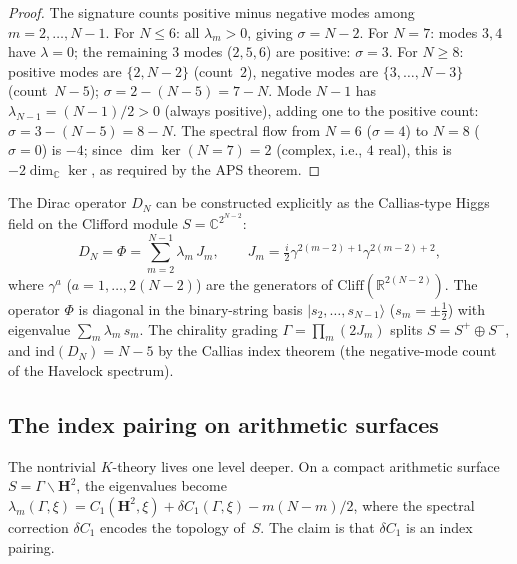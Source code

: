 \begin{proof}
The signature counts positive minus negative modes
among $m = 2, \ldots, N{-}1$.
For $N \le 6$: all $\lambda_m > 0$, giving $\sigma = N{-}2$.
For $N = 7$: modes $3, 4$ have $\lambda = 0$;
the remaining $3$ modes ($2, 5, 6$) are positive: $\sigma = 3$.
For $N \ge 8$: positive modes are $\{2, N{-}2\}$ (count~$2$),
negative modes are $\{3, \ldots, N{-}3\}$ (count~$N{-}5$);
$\sigma = 2 - (N{-}5) = 7 - N$.
Mode $N{-}1$ has $\lambda_{N-1} = (N{-}1)/2 > 0$
(always positive), adding one to the positive count:
$\sigma = 3 - (N{-}5) = 8 - N$.
The spectral flow from $N = 6$ ($\sigma = 4$) to $N = 8$
($\sigma = 0$) is $-4$; since $\dim\ker(N{=}7) = 2$
(complex, i.e., $4$ real), this is $-2\dim_{\mathbb{C}}\ker$,
as required by the APS theorem.
\end{proof}

\begin{remark}
\label{rmk:dirac-explicit}
The Dirac operator $D_N$ can be constructed explicitly as
the Callias-type Higgs field on the Clifford module
$S = \mathbb{C}^{2^{N-2}}$:
\begin{equation}\label{eq:dirac-explicit}
  D_N = \Phi = \sum_{m=2}^{N-1} \lambda_m\,J_m,
  \qquad
  J_m = \tfrac{i}{2}\gamma^{2(m-2)+1}\gamma^{2(m-2)+2},
\end{equation}
where $\gamma^a$ ($a = 1,\ldots,2(N{-}2)$) are the
generators of $\mathrm{Cliff}(\mathbb{R}^{2(N-2)})$.
The operator $\Phi$ is diagonal in the binary-string basis
$|s_2,\ldots,s_{N-1}\rangle$ ($s_m = \pm\tfrac{1}{2}$)
with eigenvalue $\sum_m \lambda_m\,s_m$.
The chirality grading $\Gamma = \prod_m (2J_m)$ splits
$S = S^+ \oplus S^-$, and
$\mathrm{ind}(D_N) = N{-}5$ by the Callias index theorem
(the negative-mode count of the Havelock spectrum).
\end{remark}

\subsection{The index pairing on arithmetic surfaces}
\label{sec:index-pairing}

The nontrivial $K$-theory lives one level deeper.
On a compact arithmetic surface $S = \Gamma\backslash\mathbf{H}^2$,
the eigenvalues become $\lambda_m(\Gamma, \xi) = C_1(\mathbf{H}^2,\xi)
+ \delta C_1(\Gamma, \xi) - m(N{-}m)/2$, where the spectral
correction $\delta C_1$ encodes the topology of~$S$.
The claim is that $\delta C_1$ is an index pairing.

